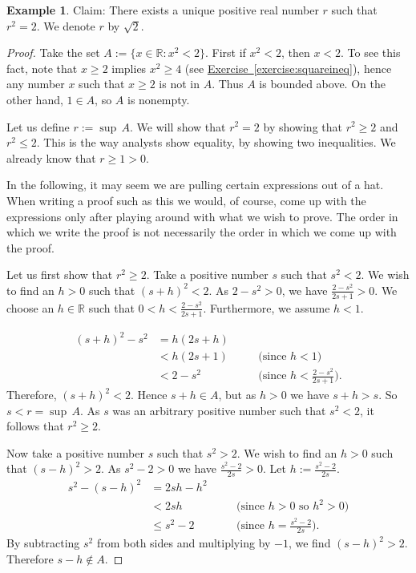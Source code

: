 \documentclass[12pt]{book}
\newcommand{\R}{{\mathbb{R}}}
\theoremstyle{plain}
\theoremstyle{remark}
\theoremstyle{definition}
\theoremstyle{exercise}
\theoremstyle{example}
\newtheorem{example}[thm]{Example}
\newcommand{\exerciseref}[1]{\hyperref[#1]{Exercise~\ref*{#1}}}
\newcommand{\propref}[1]{\hyperref[#1]{Proposition~\ref*{#1}}}
\begin{document}
\begin{example} \label{example:sqrt2}
Claim: There exists a unique positive
real number $r$ such that $r^2 = 2$.  We denote $r$ by $\sqrt{2}$.

\begin{proof}
Take the set
$A := \{ x \in \R : x^2 < 2 \}$.  First if $x^2 < 2$,
then $x < 2$.  To see this fact, note that $x \geq 2$ implies $x^2 \geq 4$
(see \exerciseref{exercise:squareineq}),
hence any number $x$ such that $x \geq 2$
is not in $A$.  Thus $A$ is bounded above.
On the other hand, $1 \in A$, so $A$ is nonempty.

Let us define $r := \sup\, A$.  We will show that $r^2 = 2$ by showing
that $r^2 \geq 2$ and $r^2 \leq 2$.  This is the way analysts show
equality, by showing two inequalities.
We already know that $r \geq 1 > 0$.

In the following, it may seem we are pulling certain expressions out of
a hat.  When writing a proof such as this we would, of course, come up with
the expressions only after playing around with what we wish to prove.  The
order in which we write the proof is not necessarily the order in which we
come up with the proof.

Let us first show that $r^2 \geq 2$.
Take a positive number $s$ such that $s^2 < 2$.  We wish to find an $h > 0$
such that ${(s+h)}^2 < 2$.
As $2-s^2 > 0$, we have $\frac{2-s^2}{2s+1} > 0$.
We choose an $h \in \R$ such that
$0 < h < \frac{2-s^2}{2s+1}$.
Furthermore, we assume $h < 1$.

\begin{equation*}
\begin{aligned}
{(s+h)}^2 - s^2 & = h(2s + h) \\
 & < h(2s+1) & & \quad \bigl(\text{since } h < 1\bigr) \\
 & < 2-s^2 & & \quad \bigl(\text{since } h < \tfrac{2-s^2}{2s+1} \bigr) .
\end{aligned}
\end{equation*}
Therefore, ${(s+h)}^2 < 2$.  Hence $s+h \in A$, but as $h > 0$
we have $s+h > s$.  So $s < r = \sup\, A$.  As $s$ was an arbitrary
positive number such that $s^2 < 2$, it follows that $r^2 \geq 2$.


Now take a positive number $s$ such that
$s^2 > 2$.  We wish to find an $h > 0$ such that
${(s-h)}^2 > 2$.
As 
$s^2-2 > 0$ we have $\frac{s^2-2}{2s} > 0$.
Let $h := \frac{s^2-2}{2s}$.
\begin{equation*}
\begin{aligned}
s^2 - {(s-h)}^2 & = 2sh - h^2 \\
 & < 2sh & & \quad \bigl( \text{since $h > 0$ so $h^2 > 0$} \bigr)  \\
 & \leq s^2-2 & & \quad \bigl( \text{since } h = \tfrac{s^2-2}{2s} \bigr) .
\end{aligned}
\end{equation*}
By subtracting $s^2$ from both sides and multiplying by $-1$, we find
${(s-h)}^2 > 2$.  Therefore $s-h \notin A$.


\end{proof}
\end{example}
\end{document}
